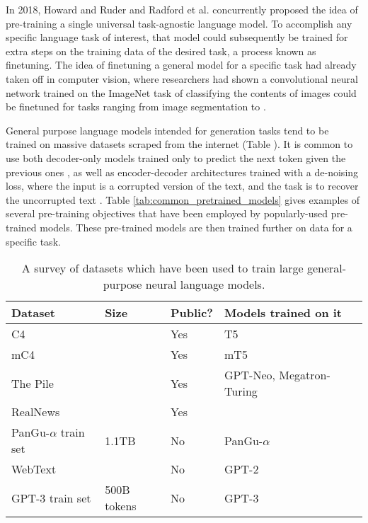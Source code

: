 In 2018, Howard and Ruder \citep{howard2018universal} and Radford et al. \citep{radford2018improving} concurrently proposed the idea of pre-training a single universal task-agnostic language model.
To accomplish any specific language task of interest, that model could subsequently be trained for extra steps on the training data of the desired task, a process known as finetuning.
The idea of finetuning a general model for a specific task had already taken off in computer vision, where researchers had shown a convolutional neural network trained on the ImageNet task of classifying the contents of images could be finetuned for tasks ranging from image segmentation to \TODO{}.

General purpose language models intended for generation tasks tend to be trained on massive datasets scraped from the internet (Table \label{tab:dataset_list}).
It is common to use both decoder-only models trained only to predict the next token given the previous ones \citep{radford2019language}, as well as encoder-decoder architectures trained with a de-noising loss, where the input is a corrupted version of the text, and the task is to recover the uncorrupted text \citep{raffel2019exploring,lewis2020bart}.
Table \ref{tab:common_pretrained_models} gives examples of several pre-training objectives that have been employed by popularly-used pre-trained models.
These pre-trained models are then trained further on data for a specific task.

\begin{table*}[htbp]
  \centering
  \small
    \begin{tabular}{lllll}
    \toprule
    Dataset & \multicolumn{1}{l}{Size} & \multicolumn{1}{l}{Public?} & \multicolumn{1}{l}{Models trained on it} \\
    \midrule
    C4    &       & {Yes} & {T5} \\
    mC4   &       & {Yes} & {mT5} \\
    The Pile &       & {Yes} & {GPT-Neo, Megatron-Turing} \\
    RealNews &       & {Yes} &       \\
    PanGu-$\alpha$ train set & {1.1TB} & {No} & {PanGu-$\alpha$} \\
    WebText &       & {No} & {GPT-2} \\
    GPT-3 train set & {500B tokens} & {No} & {GPT-3} 
    \bottomrule
    \end{tabular}%
  \caption{A survey of datasets which have been used to train large general-purpose neural language models. }
  \label{tab:dataset_list}%
\end{table*}%


